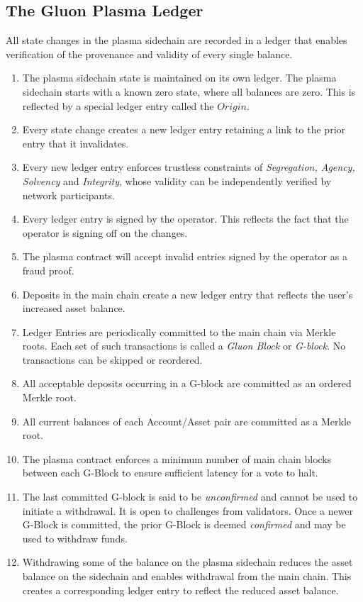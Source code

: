 \documentclass[12pt,a4paper]{article}
\begin{document}
\subsection{The Gluon Plasma Ledger}
All state changes in the plasma sidechain are recorded in a ledger that enables verification of the provenance and validity of every single balance.
\begin{enumerate}
    \item The plasma sidechain state is maintained on its own ledger. The plasma sidechain starts with a known zero state, where all balances are zero. This is reflected by a special ledger entry called the $Origin$. 
    \item Every state change creates a new ledger entry retaining a link to the prior entry that it invalidates. 
    \item Every new ledger entry enforces trustless constraints of \emph{Segregation, Agency, Solvency} and \emph{Integrity}, whose validity can be independently verified by network participants. 
    \item Every ledger entry is signed by the operator. This reflects the fact that the operator is signing off on the changes.
    \item The plasma contract will accept invalid entries signed by the operator as a fraud proof.
    \item Deposits in the main chain create a new ledger entry that reflects the user’s increased asset balance. 
    \item Ledger Entries are periodically committed to the main chain via Merkle roots. Each set of such transactions is called a \emph{Gluon Block} or \emph{G-block}. No transactions can be skipped or reordered. 
    \item All acceptable deposits occurring in a G-block are committed as an ordered Merkle root. 
    \item All current  balances of each Account/Asset pair are committed as a Merkle root.
    \item The plasma contract enforces a minimum number of main chain blocks between each G-Block to ensure sufficient latency for a vote to halt. 
    \item The last committed G-block is said to be \emph{unconfirmed} and cannot be used to initiate a withdrawal. It is open to challenges from validators. Once a newer G-Block is committed, the prior G-Block is deemed \emph{confirmed} and may be used to withdraw funds.
    \item Withdrawing some of the balance on the plasma sidechain reduces the asset balance on the sidechain and enables withdrawal from the main chain. This creates a corresponding ledger entry to reflect the reduced asset balance.
\end{enumerate}
\end{document}
